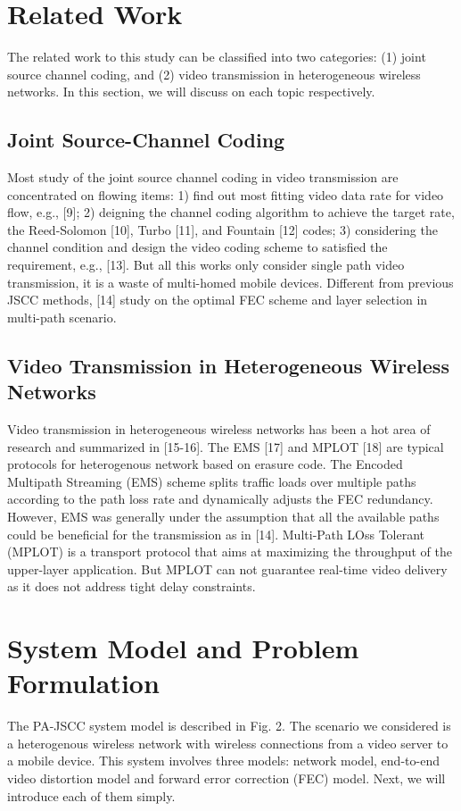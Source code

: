 \documentclass[journal]{IEEEtran}
\begin{document}
\section{Related Work}
The related work to this study can be classified into two categories: (1) joint source channel coding, and (2) video transmission in heterogeneous wireless networks. In this section, we will discuss on each topic respectively.
\subsection{Joint Source-Channel Coding}
Most study of the joint source channel coding in video transmission are concentrated on flowing items: 1) find out most fitting video data rate for video flow, e.g., [9]; 2) deigning the channel coding algorithm to achieve the target rate, the Reed-Solomon [10], Turbo [11], and Fountain [12] codes; 3) considering the channel condition and design the video coding scheme to satisfied the requirement, e.g., [13]. But all this works only consider single path video transmission, it is a waste of multi-homed mobile devices. Different from previous JSCC methods, [14] study on the optimal FEC scheme and layer selection in multi-path scenario.

\subsection{Video Transmission in Heterogeneous Wireless Networks}
Video transmission in heterogeneous wireless networks has been a hot area of research and summarized in [15-16]. The EMS [17] and MPLOT [18] are typical protocols for heterogenous network based on erasure code. The Encoded Multipath Streaming (EMS) scheme splits traffic loads over multiple paths according to the path loss rate and dynamically adjusts the FEC redundancy. However, EMS was generally under the assumption that all the available paths could be beneficial for the transmission as in [14]. Multi-Path LOss Tolerant (MPLOT) is a transport protocol that aims at maximizing the throughput of the upper-layer application. But MPLOT can not guarantee real-time video delivery as it does not address tight delay constraints.

\section{System Model and Problem Formulation}
The PA-JSCC system model is described in Fig. 2. The scenario we considered is a heterogenous wireless network with  wireless connections from a video server to a mobile device. This system involves three models: network model, end-to-end video distortion model and forward error correction (FEC) model. Next, we will introduce each of them simply.
\end{document}
